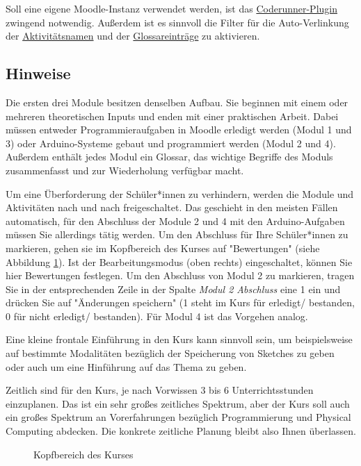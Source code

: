 \documentclass[a4paper]{article}
\begin{document}
Soll eine eigene Moodle-Instanz verwendet werden, ist das \href{https://docs.moodle.org/402/de/Fragetyp_Coderunner}{Coderunner-Plugin} zwingend notwendig. Außerdem ist es sinnvoll die Filter für die Auto-Verlinkung der \href{https://docs.moodle.org/402/de/Auto-Verlinkung_der_Aktivit%C3%A4tsnamen}{Aktivitätsnamen} und der \href{https://docs.moodle.org/402/de/Auto-Verlinkung_zu_Glossaren}{Glossareinträge} zu aktivieren.

\subsection{Hinweise}
Die ersten drei Module besitzen denselben Aufbau. Sie beginnen mit einem oder mehreren theoretischen Inputs und enden mit einer praktischen Arbeit. Dabei müssen entweder Programmieraufgaben in Moodle erledigt werden (Modul 1 und 3) oder Arduino-Systeme gebaut und programmiert werden (Modul 2 und 4). Außerdem enthält jedes Modul ein Glossar, das wichtige Begriffe des Moduls zusammenfasst und zur Wiederholung verfügbar macht.

Um eine Überforderung der Schüler*innen zu verhindern, werden die Module und Aktivitäten nach und nach freigeschaltet. Das geschieht in den meisten Fällen automatisch, für den Abschluss der Module 2 und 4 mit den Arduino-Aufgaben müssen Sie allerdings tätig werden. Um den Abschluss für Ihre Schüler*innen zu markieren, gehen sie im Kopfbereich des Kurses auf "Bewertungen" (siehe Abbildung \ref{fig:screenshot_bewertungen}). Ist der Bearbeitungsmodus (oben rechts) eingeschaltet, können Sie hier Bewertungen festlegen. Um den Abschluss von Modul 2 zu markieren, tragen Sie in der entsprechenden Zeile in der Spalte \emph{Modul 2 Abschluss} eine 1 ein und drücken Sie auf "Änderungen speichern" (1 steht im Kurs für erledigt/ bestanden, 0 für nicht erledigt/ bestanden). Für Modul 4 ist das Vorgehen analog.

Eine kleine frontale Einführung in den Kurs kann sinnvoll sein, um beispielsweise auf bestimmte Modalitäten bezüglich der Speicherung von Sketches zu geben oder auch um eine Hinführung auf das Thema zu geben.

Zeitlich sind für den Kurs, je nach Vorwissen 3 bis 6 Unterrichtsstunden einzuplanen. Das ist ein sehr großes zeitliches Spektrum, aber der Kurs soll auch ein großes Spektrum an Vorerfahrungen bezüglich Programmierung und Physical Computing abdecken. Die konkrete zeitliche Planung bleibt also Ihnen überlassen.

\begin{figure}[b]
    \centering
    \caption{Kopfbereich des Kurses}\label{fig:screenshot_bewertungen}
\end{figure}
\end{document}
